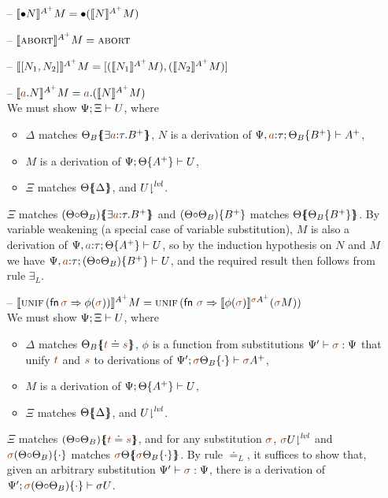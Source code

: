 \begin{itemize}
\item[--] $\lsubsta{\tfusel{N}}{M}{A^+} = \tfusel{(\lsubsta{N}{M}{A^+})}$
\item[--] $\lsubsta{\tabort}{M}{A^+} = \tabort$
\item[--] $\lsubsta{\toplusl{N_1}{N_2}}{M}{A^+} = \toplusl{(\lsubsta{N_1}{M}{A^+})}{(\lsubsta{N_2}{M}{A^+})}$
\item[--] $\lsubsta{\texistsl{\lf{a}}{N}}{M}{A^+} = \texistsl{\lf{a}}{(\lsubsta{N}{M}{A^+})}$\smallskip\\
  We must show $\foc{\Psi}{\Xi}{U}$, where
  \begin{itemize}
  \item $\Delta$ matches $\frameoff{\Theta_B}{\exists \lf{a}{:}\tau.B^+}$, 
     $N$ is a derivation of $\foc{\Psi,\lf{a}{:}\tau}{\tackon{\Theta_B}{B^+}}{A^+}$,
  \item $M$ is a derivation of $\foc{\Psi}{\tackon{\Theta}{A^+}}{U}$,
  \item $\Xi$ matches $\frameoff{\Theta}{\Delta}$, and
     $\restrictfrom{U}{\mlvl}$.
  \end{itemize}
  $\Xi$ matches $\frameoff{(\Theta{\circ}\Theta_B)}{\exists \lf{a}{:}\tau.B^+}$
  and $\tackon{(\Theta{\circ}\Theta_B)}{B^+}$ matches 
  $\frameoff{\Theta}{\tackon{\Theta_B}{B^+}}$. By variable weakening (a special case of variable substitution),
  $M$ is also a derivation of $\foc{\Psi, \lf{a}{:}\tau}{\tackon{\Theta}{A^+}}{U}$,
  so by the induction hypothesis on $N$ and $M$ we have
  $\foc{\Psi, \lf{a}{:}\tau}{\tackon{(\Theta{\circ}\Theta_B)}{B^+}}{U}$, 
  and the required result then follows from rule $\exists_L$. \smallskip

\item[--] $\lsubsta{\textsc{unif}\,({\sf fn}\,\lf\sigma \Rightarrow \phi(\lf\sigma))}{M}{{A^+}}
           = \textsc{unif}\,(\mathsf{fn}~\lf\sigma \Rightarrow \lsubsta{\phi(\lf\sigma)}{(\lf\sigma{M})}{\lf\sigma A^+})$\smallskip\\
  We must show $\foc{\Psi}{\Xi}{U}$, where
  \begin{itemize}
  \item $\Delta$ matches $\frameoff{\Theta_B}{\lf t \doteq \lf s}$,
    $\phi$ is a function from substitutions $\Psi' \vdash \lf \sigma : \Psi$
    that unify $\lf t$ and $\lf s$ to derivations of 
    $\foc{\Psi'}{\tackon{\lf \sigma{\Theta_B}}{\cdot}}{\lf \sigma{A^+}}$,
  \item $M$ is a derivation of $\foc{\Psi}{\tackon{\Theta}{A^+}}{U}$,
  \item $\Xi$ matches $\frameoff{\Theta}{\Delta}$, and 
     $\restrictfrom{U}{\mlvl}$.
  \end{itemize}
  $\Xi$ matches $\frameoff{(\Theta{\circ}\Theta_B)}{\lf t \doteq \lf s}$, and 
  for any substitution $\lf \sigma$, 
  $\restrictfrom{\lf \sigma{U}}{\mlvl}$ and
  $\tackon{\lf \sigma(\Theta{\circ}\Theta_B)}{\cdot}$ matches 
  $\frameoff{\lf \sigma\Theta}{\tackon{\lf\sigma\Theta_B}{\cdot}}$.
  By rule $\doteq_L$, it suffices to show that, 
  given an arbitrary substitution $\Psi' \vdash \lf\sigma : \Psi$, 
  there is a derivation of 
  $\foc{\Psi'}{\tackon{\lf \sigma(\Theta{\circ}\Theta_B)}{\cdot}}{\sigma{U}}$.
  


\end{itemize}
